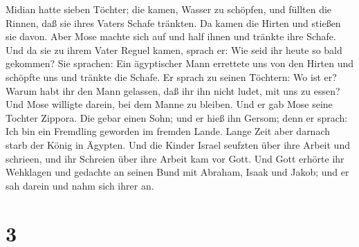 Midian hatte sieben Töchter; die kamen, Wasser zu schöpfen, und füllten
die Rinnen, daß sie ihres Vaters Schafe tränkten.  Da kamen
die Hirten und stießen sie davon. Aber Mose machte sich auf und half
ihnen und tränkte ihre Schafe.  Und da sie zu ihrem Vater
Reguel kamen, sprach er: Wie seid ihr heute so bald gekommen?
 Sie sprachen: Ein ägyptischer Mann errettete uns von den
Hirten und schöpfte uns und tränkte die Schafe.  Er sprach
zu seinen Töchtern: Wo ist er? Warum habt ihr den Mann gelassen, daß ihr
ihn nicht ludet, mit uns zu essen?  Und Mose willigte
darein, bei dem Manne zu bleiben. Und er gab Mose seine Tochter Zippora.
 Die gebar einen Sohn; und er hieß ihn Gersom; denn er
sprach: Ich bin ein Fremdling geworden im fremden Lande. 
Lange Zeit aber darnach starb der König in Ägypten. Und die Kinder
Israel seufzten über ihre Arbeit und schrieen, und ihr Schreien über
ihre Arbeit kam vor Gott.  Und Gott erhörte ihr Wehklagen
und gedachte an seinen Bund mit Abraham, Isaak und Jakob; 
und er sah darein und nahm sich ihrer an.

\hypertarget{section-2}{%
\section{3}\label{section-2}}

